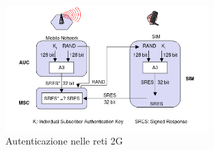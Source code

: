 \begin{figure}[h]
    \centering
    \includegraphics[width=0.7\textwidth]{images/auth-2g.png}
    \caption{Autenticazione nelle reti 2G}
\end{figure}

\clearpage

